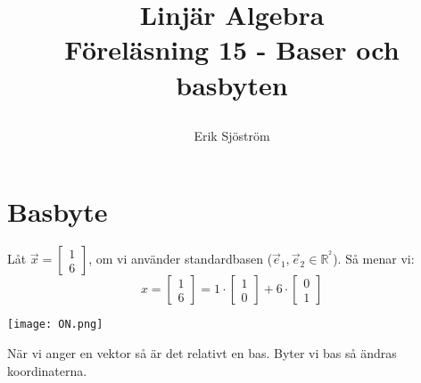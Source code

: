 

\title{
	 Linjär Algebra\\
	 Föreläsning 15 - Baser och basbyten
    \author{Erik Sjöström}
}

\maketitle

\section{Basbyte} %
\label{sec:basbyte}
\begin{Ex}
	Låt $\vec{x} = \begin{bmatrix} 1\\6 \end{bmatrix}$, om vi använder standardbasen ($\vec{e}_1, \vec{e}_2 \in \mathbb{R}^^2$). Så menar vi:
	\[
	x = \begin{bmatrix} 1\\6 \end{bmatrix} = 1 \cdot \begin{bmatrix} 1\\0 \end{bmatrix} + 6 \cdot \begin{bmatrix} 0\\1 \end{bmatrix}
	\]
	\begin{center}
		\texttt{[image: ON.png]}
	\end{center}
\end{Ex}
När vi anger en vektor så är det relativt en bas. Byter vi bas så ändras koordinaterna.
